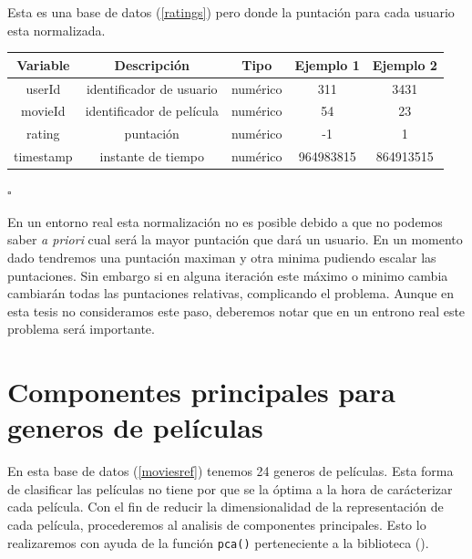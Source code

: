 \begin{db}\label{ratingsnorm}
    Esta es una base de datos (\ref{ratings}) pero donde la puntación para cada usuario esta normalizada.
    \begin{center}
        \begin{tabular}{|c|c|c|c|c|}
        \hline
        \textbf{Variable} & \textbf{Descripción} & \textbf{Tipo} & \textbf{Ejemplo 1} & \textbf{Ejemplo 2} \\ 
        \hline
         userId & identificador de usuario   & numérico & 311 & 3431 \\  
        \hline
         movieId & identificador de película & numérico & 54 & 23 \\
        \hline
         rating & puntación  & numérico & -1 & 1 \\
        \hline
        timestamp & instante de tiempo  & numérico & 964983815 & 864913515 \\        
         \hline
        \end{tabular}
    \end{center} 
    \hfill$\square$
\end{db}


\begin{obs}
    En un entorno real esta normalización no es posible debido a que no podemos saber \emph{a priori} cual será la mayor puntación que dará un usuario. En un momento dado tendremos una puntación maximan y otra minima pudiendo escalar las puntaciones. Sin embargo si en alguna iteración este máximo o minimo cambia cambiarán todas las puntaciones relativas, complicando el problema. Aunque en esta tesis no consideramos este paso, deberemos notar que en un entrono real este problema será importante.
\end{obs}


\section{Componentes principales para generos de películas}

En esta base de datos (\ref{moviesref}) tenemos 24 generos de películas. Esta forma de clasificar las películas no tiene por que se la óptima a la hora de carácterizar cada película. Con el fin de reducir la dimensionalidad de la representación de cada película, procederemos al analisis de componentes principales. Esto lo realizaremos con ayuda de la función \verb|pca()| perteneciente a la biblioteca (\cite{MATPCA}).

